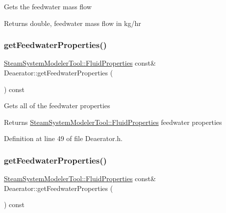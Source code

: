 Gets the feedwater mass flow \begin{DoxyReturn}{Returns}
double, feedwater mass flow in kg/hr 
\end{DoxyReturn}
\mbox{\label{class_deaerator_ab2ab900e36c86e48ad92c4013c471d6b}} 
\subsubsection{\texorpdfstring{get\+Feedwater\+Properties()}{getFeedwaterProperties()}\hspace{0.1cm}{\footnotesize\ttfamily [1/3]}}
{\footnotesize\ttfamily \hyperlink{struct_steam_system_modeler_tool_1_1_fluid_properties}{Steam\+System\+Modeler\+Tool\+::\+Fluid\+Properties} const\& Deaerator\+::get\+Feedwater\+Properties (\begin{DoxyParamCaption}{ }\end{DoxyParamCaption}) const\hspace{0.3cm}{\ttfamily [inline]}}

Gets all of the feedwater properties \begin{DoxyReturn}{Returns}
\hyperlink{struct_steam_system_modeler_tool_1_1_fluid_properties}{Steam\+System\+Modeler\+Tool\+::\+Fluid\+Properties} feedwater properties 
\end{DoxyReturn}


Definition at line 49 of file Deaerator.\+h.

\mbox{\label{class_deaerator_ab2ab900e36c86e48ad92c4013c471d6b}} 
\subsubsection{\texorpdfstring{get\+Feedwater\+Properties()}{getFeedwaterProperties()}\hspace{0.1cm}{\footnotesize\ttfamily [2/3]}}
{\footnotesize\ttfamily \hyperlink{struct_steam_system_modeler_tool_1_1_fluid_properties}{Steam\+System\+Modeler\+Tool\+::\+Fluid\+Properties} const\& Deaerator\+::get\+Feedwater\+Properties (\begin{DoxyParamCaption}{ }\end{DoxyParamCaption}) const\hspace{0.3cm}{\ttfamily [inline]}}

